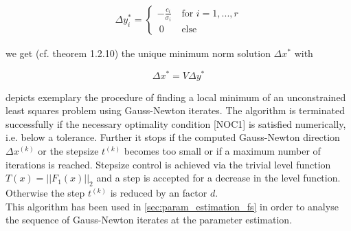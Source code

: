 \documentclass{scrartcl}[12pt, halfparskip]
\numberwithin{equation}{section}
\numberwithin{figure}{section}
\numberwithin{table}{section}
\begin{document}
\begin{itemize}
	\begin{align}
		\Delta y_i^* = 
		\begin{cases}
			- \frac{c_i}{\sigma_i} \ & \text{for } i=1,...,r \\
			\ 0 \ & \text{else}
		\end{cases}
	\end{align}
	
	we get (cf. \cite{numerical_methods_lsq_Bjorck} theorem 1.2.10) the unique minimum norm solution  $\Delta x^*$ with
	
	\begin{equation}
		\Delta x^* = V \Delta y^*
	\end{equation}


\end{itemize}

\vspace{0.5cm}
 depicts exemplary the procedure of finding a local minimum of an unconstrained least squares problem using Gauss-Newton iterates. The algorithm is terminated successfully if the necessary optimality condition [NOC1] is satisfied numerically, i.e. below a tolerance. Further it stops if the computed Gauss-Newton direction $\Delta x^{(k)}$ or the stepsize $t^{(k)}$ becomes too small or if a maximum number of iterations is reached. Stepsize control is achieved via the trivial level function $T(x) = ||F_1(x)||_2$ and a step is accepted for a decrease in the level function. Otherwise the step $t^{(k)}$ is reduced by an factor $d$. \\
This algorithm has been used in \cref{sec:param_estimation_fs} in order to analyse the sequence of Gauss-Newton iterates at the parameter estimation.  \\
\end{document}
